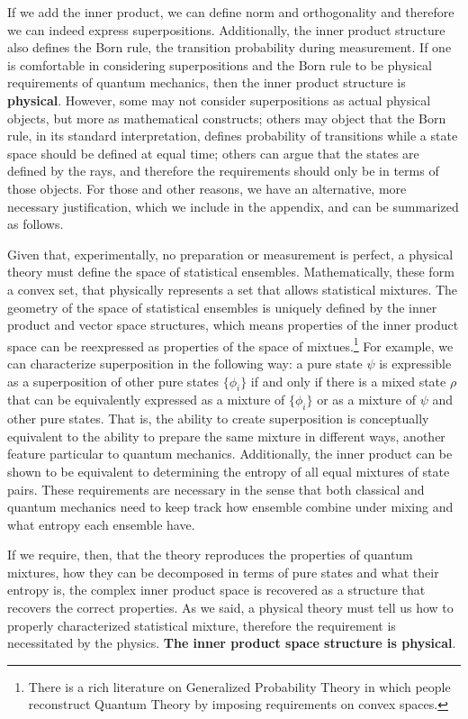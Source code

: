\documentclass[10pt,twocolumn, nofootinbib]{revtex4-2}
\begin{document}
If we add the inner product, we can define norm and orthogonality and therefore we can indeed express superpositions. Additionally, the inner product structure also defines the Born rule, the transition probability during measurement. If one is comfortable in considering superpositions and the Born rule to be physical requirements of quantum mechanics, then the inner product structure is \textbf{physical}. However, some may not consider superpositions as actual physical objects, but more as mathematical constructs; others may object that the Born rule, in its standard interpretation, defines probability of transitions while a state space should be defined at equal time; others can argue that the states are defined by the rays, and therefore the requirements should only be in terms of those objects. For those and other reasons, we have an alternative, more necessary justification, which we include in the appendix, and can be summarized as follows.

Given that, experimentally, no preparation or measurement is perfect, a physical theory must define the space of statistical ensembles. Mathematically, these form a convex set, that physically represents a set that allows statistical mixtures. The geometry of the space of statistical ensembles is uniquely defined by the inner product and vector space structures, which means properties of the inner product space can be reexpressed as properties of the space of mixtues.\footnote{There is a rich literature on Generalized Probability Theory in which people reconstruct Quantum Theory by imposing requirements on convex spaces.} For example, we can characterize superposition in the following way: a pure state $\psi$ is expressible as a superposition of other pure states $\{\phi_i\}$ if and only if there is a mixed state $\rho$ that can be equivalently expressed as a mixture of $\{\phi_i\}$ or as a mixture of $\psi$ and other pure states. That is, the ability to create superposition is conceptually equivalent to the ability to prepare the same mixture in different ways, another feature particular to quantum mechanics. Additionally, the inner product can be shown to be equivalent to determining the entropy of all equal mixtures of state pairs. These requirements are necessary in the sense that both classical and quantum mechanics need to keep track how ensemble combine under mixing and what entropy each ensemble have.

If we require, then, that the theory reproduces the properties of quantum mixtures, how they can be decomposed in terms of pure states and what their entropy is, the complex inner product space is recovered as a structure that recovers the correct properties. As we said, a physical theory must tell us how to properly characterized statistical mixture, therefore the requirement is necessitated by the physics. \textbf{The inner product space structure is physical}.
\end{document}
